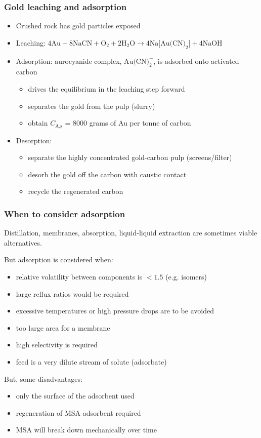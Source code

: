 \begin{frame}\frametitle{Gold leaching and adsorption}	
	\begin{itemize}
		\item	Crushed rock has gold particles exposed
		\item	Leaching: $4\text{Au} + 8\text{NaCN} + \text{O}_2 + 2 \text{H}_2\text{O} \longrightarrow  4 \text{Na[Au(CN)}_2\text{]} + 4 \text{NaOH}$
		\item	Adsorption: aurocyanide complex, $\text{Au(CN)}_2^{-}$, is adsorbed onto activated carbon
			\begin{itemize}
				\item	drives the equilibrium in the leaching step forward
				\item	separates the gold from the pulp (slurry)
				\item	obtain $C_\text{A,s}$ = 8000 grams of Au per tonne of carbon
			\end{itemize}
		\item	Desorption: 
			\begin{itemize}
				\item	separate the highly concentrated gold-carbon pulp (screens/filter)
				\item	desorb the gold off the carbon with caustic contact
				\item	recycle the regenerated carbon
			\end{itemize}
	\end{itemize}
\end{frame}

\begin{frame}\frametitle{When to consider adsorption}
	Distillation, membranes, absorption, liquid-liquid extraction are sometimes viable alternatives. 
	
	\vspace{12pt}
	But adsorption is considered when:
	\begin{itemize}
		\item	relative volatility between components is $<1.5$ (e.g. isomers)
		\item	large reflux ratios would be required
		\item	excessive temperatures or high pressure drops are to be avoided
		\item	too large area for a membrane
		\item	high selectivity is required
		\item	feed is a very dilute stream of solute (adsorbate) 
	\end{itemize}
	But, some disadvantages:
	\begin{itemize}
		\item	only the surface of the adsorbent used
		\item	regeneration of MSA adsorbent required
		\item	MSA will break down mechanically over time
	\end{itemize}
\end{frame}

